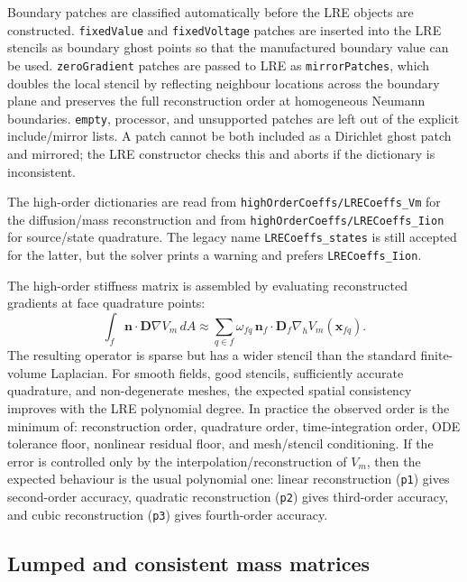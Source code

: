 \documentclass[11pt,a4paper]{article}
\newcommand{\code}[1]{\texttt{\small #1}}
\newcommand{\Vm}{V_m}
\newcommand{\Dten}{\mathbf{D}}
\newcommand{\grad}{\nabla}
\begin{document}
Boundary patches are classified automatically before the LRE objects are
constructed. \code{fixedValue} and \code{fixedVoltage} patches are inserted into
the LRE stencils as boundary ghost points so that the manufactured boundary
value can be used. \code{zeroGradient} patches are passed to LRE as
\code{mirrorPatches}, which doubles the local stencil by reflecting neighbour
locations across the boundary plane and preserves the full reconstruction order
at homogeneous Neumann boundaries. \code{empty}, processor, and unsupported
patches are left out of the explicit include/mirror lists. A patch cannot be
both included as a Dirichlet ghost patch and mirrored; the LRE constructor
checks this and aborts if the dictionary is inconsistent.

The high-order dictionaries are read from
\code{highOrderCoeffs/LRECoeffs\_Vm} for the diffusion/mass reconstruction and
from \code{highOrderCoeffs/LRECoeffs\_Iion} for source/state quadrature. The
legacy name \code{LRECoeffs\_states} is still accepted for the latter, but the
solver prints a warning and prefers \code{LRECoeffs\_Iion}.

The high-order stiffness matrix is assembled by evaluating reconstructed
gradients at face quadrature points:
\begin{equation}
  \int_f \mathbf{n}\cdot\Dten\grad\Vm\,dA
  \approx
  \sum_{q\in f}\omega_{fq}\,
  \mathbf{n}_f\cdot\Dten_f
  \grad_h \Vm(\mathbf{x}_{fq}).
  \label{eq:ho-face}
\end{equation}
The resulting operator is sparse but has a wider stencil than the standard
finite-volume Laplacian. For smooth fields, good stencils, sufficiently accurate
quadrature, and non-degenerate meshes, the expected spatial consistency improves
with the LRE polynomial degree. In practice the observed order is the minimum
of: reconstruction order, quadrature order, time-integration order, ODE
tolerance floor, nonlinear residual floor, and mesh/stencil conditioning.
If the error is controlled only by the interpolation/reconstruction of $\Vm$,
then the expected behaviour is the usual polynomial one: linear reconstruction
(\code{p1}) gives second-order accuracy, quadratic reconstruction (\code{p2})
gives third-order accuracy, and cubic reconstruction (\code{p3}) gives
fourth-order accuracy.

\subsection{Lumped and consistent mass matrices}
\end{document}
